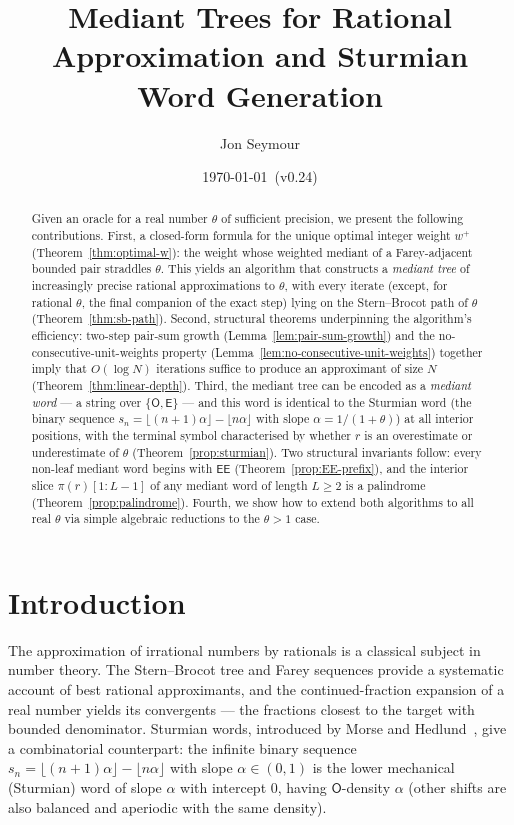\documentclass[12pt]{article}
\title{Mediant Trees for Rational Approximation and Sturmian Word Generation}
\author{Jon Seymour}
\date{\today\ (v0.24)}
\theoremstyle{definition}
\theoremstyle{remark}
\theoremstyle{plain}
\newcommand{\OO}{\mathsf{O}}
\newcommand{\EE}{\mathsf{E}}
\newcommand{\wplus}{w^{+}}
\begin{document}
\maketitle

\begin{abstract}
Given an oracle for a real number $\theta$ of sufficient precision, we present the
following contributions.
First, a closed-form formula for the unique optimal integer weight $\wplus$
(Theorem~\ref{thm:optimal-w}): the weight whose weighted mediant of a
Farey-adjacent bounded pair straddles $\theta$.
This yields an algorithm that constructs a \emph{mediant tree} of increasingly
precise rational approximations to $\theta$, with every iterate (except, for
rational $\theta$, the final companion of the exact step) lying on the
Stern--Brocot path of $\theta$ (Theorem~\ref{thm:sb-path}).
Second, structural theorems underpinning the algorithm's efficiency: two-step
pair-sum growth (Lemma~\ref{lem:pair-sum-growth}) and the no-consecutive-unit-weights
property (Lemma~\ref{lem:no-consecutive-unit-weights}) together imply that $O(\log N)$
iterations suffice to produce an approximant of size $N$
(Theorem~\ref{thm:linear-depth}).
Third, the mediant tree can be encoded as a \emph{mediant word} --- a string over
$\{\OO, \EE\}$ --- and this word is identical to the Sturmian word
(the binary sequence $s_n = \lfloor(n{+}1)\alpha\rfloor - \lfloor n\alpha\rfloor$
with slope $\alpha = 1/(1{+}\theta)$) at all interior positions, with the terminal
symbol characterised by whether $r$ is an overestimate or underestimate of $\theta$
(Theorem~\ref{prop:sturmian}).
Two structural invariants follow: every non-leaf mediant word begins with $\EE\EE$
(Theorem~\ref{prop:EE-prefix}), and the interior slice $\pi(r)[1{:}L{-}1]$ of any
mediant word of length $L \geq 2$ is a palindrome (Theorem~\ref{prop:palindrome}).
Fourth, we show how to extend both algorithms to all real $\theta$ via simple
algebraic reductions to the $\theta > 1$ case.
\end{abstract}

\tableofcontents

\section{Introduction}
\label{sec:intro}

The approximation of irrational numbers by rationals is a classical subject in number theory.
The Stern--Brocot tree and Farey sequences provide a systematic account of best rational
approximants, and the continued-fraction expansion of a real number yields its
convergents --- the fractions closest to the target with bounded denominator.
Sturmian words, introduced by Morse and Hedlund~\cite{morse1940}, give a
combinatorial counterpart: the infinite binary sequence $s_n = \lfloor(n+1)\alpha\rfloor -
\lfloor n\alpha\rfloor$ with slope $\alpha \in (0,1)$ is the lower mechanical (Sturmian)
word of slope $\alpha$ with intercept $0$, having $\mathsf{O}$-density $\alpha$
(other shifts are also balanced and aperiodic with the same density).
\end{document}
